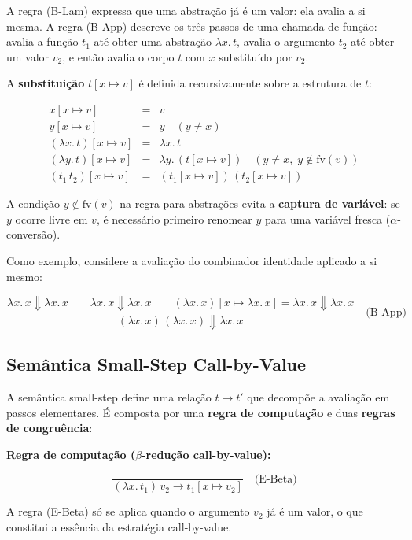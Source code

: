 A regra (B-Lam) expressa que uma abstração já é um valor: ela avalia
a si mesma. A regra (B-App) descreve os três passos de uma chamada de
função: avalia a função \(t_1\) até obter uma abstração \(\lambda
x.\, t\), avalia o argumento \(t_2\) até obter um valor \(v_2\), e
então avalia o corpo \(t\) com \(x\) substituído por \(v_2\).

A \textbf{substituição} \(t[x \mapsto v]\) é definida recursivamente
sobre a estrutura de \(t\):

\[
  \begin{array}{rcl}
    x[x \mapsto v] & = & v \\
    y[x \mapsto v] & = & y \quad (y \neq x) \\
    (\lambda x.\, t)[x \mapsto v] & = & \lambda x.\, t \\
    (\lambda y.\, t)[x \mapsto v] & = & \lambda y.\, (t[x \mapsto v]) \quad (y
    \neq x,\; y \notin \mathrm{fv}(v)) \\
    (t_1\, t_2)[x \mapsto v] & = & (t_1[x
    \mapsto v])\,(t_2[x \mapsto v])
\end{array} \]

A condição \(y \notin \mathrm{fv}(v)\) na regra para abstrações evita
a \textbf{captura de variável}: se \(y\) ocorre livre em \(v\), é
necessário primeiro renomear \(y\) para uma variável fresca
(\(\alpha\)-conversão).

Como exemplo, considere a avaliação do combinador identidade aplicado
a si mesmo:

\[ \dfrac{ \lambda x.\, x \Downarrow \lambda x.\, x \qquad \lambda x.\, x
    \Downarrow \lambda x.\, x \qquad (\lambda x.\, x)[x \mapsto
    \lambda x.\, x] =
  \lambda x.\, x \Downarrow \lambda x.\, x }{ (\lambda x.\, x)\,(\lambda x.\,
x) \Downarrow \lambda x.\, x } \quad\text{(B-App)} \]

\subsection{Semântica Small-Step Call-by-Value}

A semântica small-step define uma relação \(t \to t'\) que decompõe a
avaliação em passos elementares. É composta por uma \textbf{regra de
computação} e duas \textbf{regras de congruência}:

\textbf{Regra de computação (\(\beta\)-redução call-by-value):}

\[ \dfrac{}{(\lambda x.\, t_1)\, v_2 \to t_1[x \mapsto v_2]}
\quad\text{(E-Beta)} \]

A regra (E-Beta) só se aplica quando o argumento \(v_2\) já é um
valor, o que constitui a essência da estratégia call-by-value.

